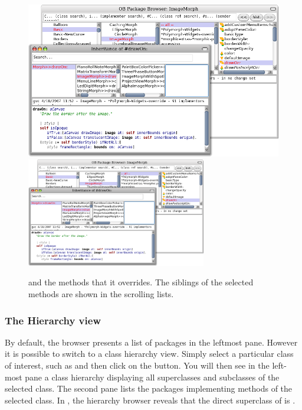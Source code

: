 \documentclass[a4paper,10pt,twoside]{book}
\begin{document}
\begin{figure}[btp]
	\begin{center}
   \ifluluelse
		{\includegraphics[width=\textwidth]{OBInheritanceOverriding}}
		{\includegraphics[width=0.7\textwidth]{OBInheritanceOverriding}}
	\end{center}
	\caption{ and the methods that it overrides. The siblings of the selected methods are shown in the scrolling lists.}
\end{figure}

\subsubsection{The Hierarchy view}

By default, the browser presents a list of packages in the leftmost pane.
However it is possible to switch to a class hierarchy view.
Simply select a particular class of interest, such as  and then click on the  button.
You will then see in the left-most pane a class hierarchy displaying all superclasses and subclasses of the selected class.
The second pane lists the packages implementing methods of the selected class.
In , the hierarchy browser reveals that the direct superclass of  is .
\end{document}

